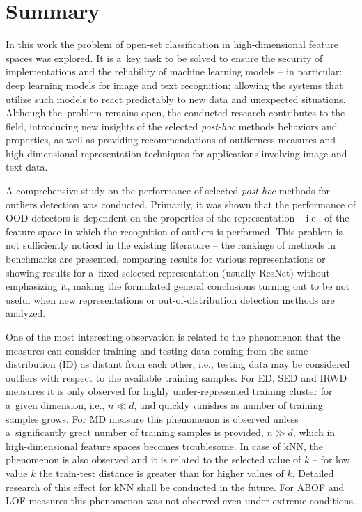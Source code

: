 \chapter{Summary}
\label{chapter:summary}

In this work the problem of open-set classification in high-dimensional feature spaces was explored. It is a~key task to be solved to ensure the security of implementations and the reliability of machine learning models – in particular: deep learning models for image and text recognition; allowing the systems that utilize such models to react predictably to new data and unexpected situations. Although the~problem remains open, the conducted research contributes to the field, introducing new insights of the selected \textit{post-hoc} methods behaviors and properties, as well as providing recommendations of outlierness measures and high-dimensional representation techniques for applications involving image and text data.

A comprehensive study on the performance of selected \textit{post-hoc} methods for outliers detection was conducted. Primarily, it was shown that the performance of OOD detectors is dependent on the properties of the representation – i.e., of the feature space in which the recognition of outliers is performed. This problem is not sufficiently noticed in the existing literature – the rankings of methods in benchmarks are presented, comparing results for various representations or showing results for a~fixed selected representation (usually ResNet) without emphasizing it, making the formulated general conclusions turning out to be not useful when new representations or out-of-distribution detection methods are analyzed.

One of the most interesting observation is related to the phenomenon that the measures can consider training and testing data coming from the same distribution (ID) as distant from each other, i.e., testing data may be considered outliers with respect to the available training samples. For ED, SED and IRWD measures it is only observed for highly under-represented training cluster for a~given dimension, i.e., $n \ll d$, and quickly vanishes as number of training samples grows. For MD measure this phenomenon is observed unless a~significantly great number of training samples is provided, $n \gg d$, which in high-dimensional feature spaces becomes troublesome. In case of kNN, the phenomenon is also observed and it is related to the selected value of $k$ – for low value $k$ the train-test distance is greater than for higher values of $k$. Detailed research of this effect for kNN shall be conducted in the future. For ABOF and LOF measures this phenomenon was not observed even under extreme conditions.

